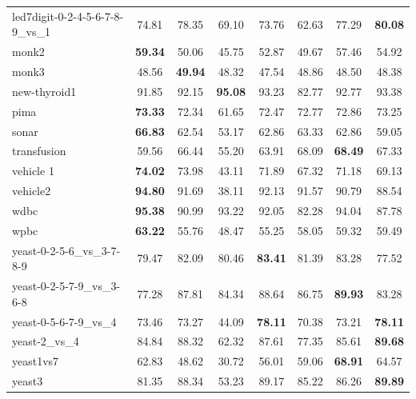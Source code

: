 \begin{table}[!p]
{\begin{tabular}{lccccccc}
led7digit-0-2-4-5-6-7-8-9\_vs\_1 & 74.81 & 78.35 & 69.10 & 73.76 & 62.63 & 77.29 & \textbf{80.08} \\
monk2 & \textbf{59.34} & 50.06 & 45.75 & 52.87 & 49.67 & 57.46 & 54.92 \\
monk3 & 48.56 & \textbf{49.94} & 48.32 & 47.54 & 48.86 & 48.50 & 48.38 \\
new-thyroid1 & 91.85 & 92.15 & \textbf{95.08} & 93.23 & 82.77 & 92.77 & 93.38 \\
pima & \textbf{73.33} & 72.34 & 61.65 & 72.47 & 72.77 & 72.86 & 73.25 \\
sonar & \textbf{66.83} & 62.54 & 53.17 & 62.86 & 63.33 & 62.86 & 59.05 \\
transfusion & 59.56 & 66.44 & 55.20 & 63.91 & 68.09 & \textbf{68.49} & 67.33 \\
vehicle 1 & \textbf{74.02} & 73.98 & 43.11 & 71.89 & 67.32 & 71.18 & 69.13 \\
vehicle2 & \textbf{94.80} & 91.69 & 38.11 & 92.13 & 91.57 & 90.79 & 88.54 \\
wdbc & \textbf{95.38} & 90.99 & 93.22 & 92.05 & 82.28 & 94.04 & 87.78 \\
wpbc & \textbf{63.22} & 55.76 & 48.47 & 55.25 & 58.05 & 59.32 & 59.49 \\
yeast-0-2-5-6\_vs\_3-7-8-9 & 79.47 & 82.09 & 80.46 & \textbf{83.41} & 81.39 & 83.28 & 77.52 \\
yeast-0-2-5-7-9\_vs\_3-6-8 & 77.28 & 87.81 & 84.34 & 88.64 & 86.75 & \textbf{89.93} & 83.28 \\
yeast-0-5-6-7-9\_vs\_4 & 73.46 & 73.27 & 44.09 & \textbf{78.11} & 70.38 & 73.21 & \textbf{78.11} \\
yeast-2\_vs\_4 & 84.84 & 88.32 & 62.32 & 87.61 & 77.35 & 85.61 & \textbf{89.68} \\
yeast1vs7 & 62.83 & 48.62 & 30.72 & 56.01 & 59.06 & \textbf{68.91} & 64.57 \\
yeast3 & 81.35 & 88.34 & 53.23 & 89.17 & 85.22 & 86.26 & \textbf{89.89} \\
\bottomrule
\end{tabular}}
\end{table}
